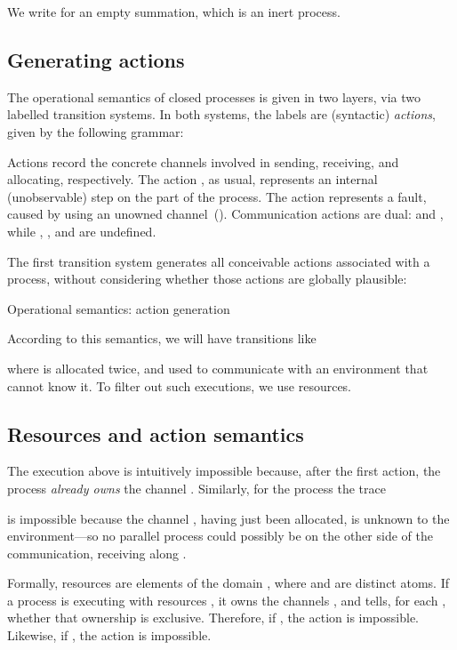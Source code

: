 \documentclass{entcs}
\begin{document}
We write  for an empty summation, which is an inert process.

\subsection{Generating actions}

The operational semantics of closed processes is given in two layers,
via two labelled transition systems.  In both systems, the
labels are (syntactic) \emph{actions}, given by the following grammar:

Actions record the concrete channels involved in sending, receiving,
and allocating, respectively.  The action , as usual, represents
an internal (unobservable) step on the part of the process.  The
action  represents a fault, caused by using an unowned
channel~().  Communication actions are dual:  and
, while , , and 
are undefined.

The first transition system generates all conceivable actions
associated with a process, without considering whether those actions
are globally plausible:

\begin{display}[]{Operational semantics: action generation}

\end{display}
According to this semantics, we will have transitions like

where  is allocated twice, and used to communicate with an
environment that cannot know it.  To filter out such executions, we
use resources.

\subsection{Resources and action semantics}\label{sec:action-sem}

The execution above is intuitively impossible because, after the first
 action, the process \emph{already owns} the channel .
Similarly, for the process  the trace

is impossible because the channel , having just been allocated, is
unknown to the environment---so no parallel process could possibly be
on the other side of the communication, receiving along .

Formally, resources are elements  of the domain , where 
and  are distinct atoms.  If a process is executing with
resources , it owns the channels , and
 tells, for each , whether that ownership is exclusive.
Therefore, if , the action  is impossible.
Likewise, if , the action  is impossible.
\end{document}
